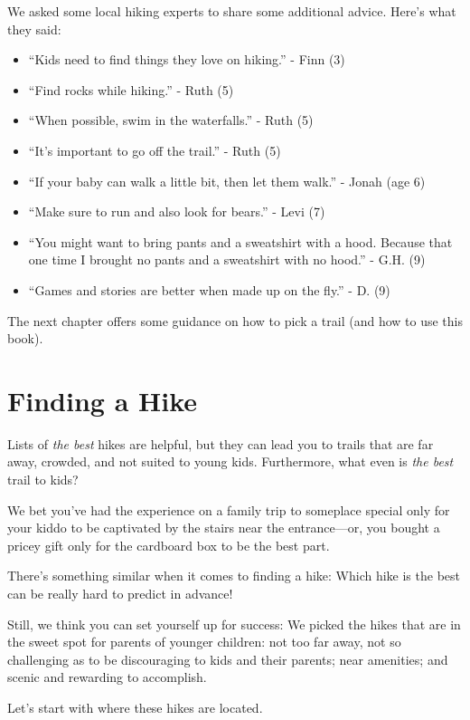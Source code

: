 \documentclass[
  letterpaper,
  DIV=11,
  numbers=noendperiod]{scrreprt}
\providecommand{\tightlist}{%
  \setlength{\itemsep}{0pt}\setlength{\parskip}{0pt}}\usepackage{longtable,booktabs,array}
\begin{document}
We asked some local hiking experts to share some additional advice.
Here's what they said:

\begin{itemize}
\tightlist
\item
  ``Kids need to find things they love on hiking.'' - Finn (3)
\item
  ``Find rocks while hiking.'' - Ruth (5)
\item
  ``When possible, swim in the waterfalls.'' - Ruth (5)
\item
  ``It's important to go off the trail.'' - Ruth (5)
\item
  ``If your baby can walk a little bit, then let them walk.'' - Jonah
  (age 6)
\item
  ``Make sure to run and also look for bears.'' - Levi (7)
\item
  ``You might want to bring pants and a sweatshirt with a hood. Because
  that one time I brought no pants and a sweatshirt with no hood.'' -
  G.H. (9)
\item
  ``Games and stories are better when made up on the fly.'' - D. (9)
\end{itemize}

The next chapter offers some guidance on how to pick a trail (and how to
use this book).

\chapter{Finding a Hike}\label{finding-a-hike}

Lists of \emph{the best} hikes are helpful, but they can lead you to
trails that are far away, crowded, and not suited to young kids.
Furthermore, what even is \emph{the best} trail to kids?

We bet you've had the experience on a family trip to someplace special
only for your kiddo to be captivated by the stairs near the
entrance---or, you bought a pricey gift only for the cardboard box to be
the best part.

There's something similar when it comes to finding a hike: Which hike is
the best can be really hard to predict in advance!

Still, we think you can set yourself up for success: We picked the hikes
that are in the sweet spot for parents of younger children: not too far
away, not so challenging as to be discouraging to kids and their
parents; near amenities; and scenic and rewarding to accomplish.

Let's start with where these hikes are located.
\end{document}
